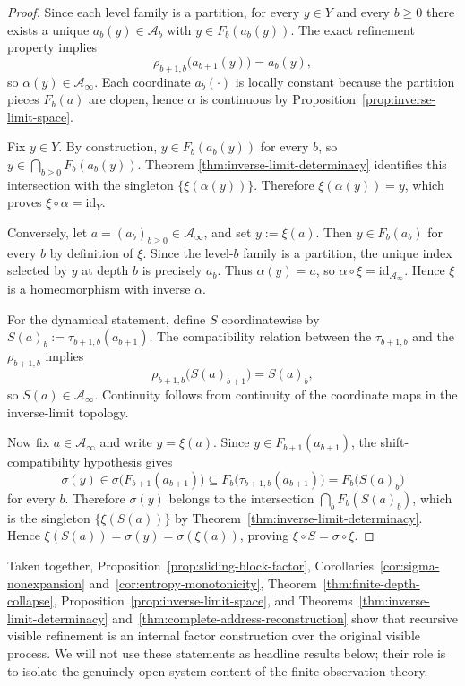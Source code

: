 \begin{proof}
Since each level family is a partition, for every \(y\in Y\) and every
\(b\geq 0\) there exists a unique \(a_b(y)\in\mathcal{A}_b\) with
\(y\in F_b(a_b(y))\).  The exact refinement property implies
\[
  \rho_{b+1,b}\bigl(a_{b+1}(y)\bigr)=a_b(y),
\]
so \(\alpha(y)\in\mathcal{A}_\infty\).  Each coordinate \(a_b(\cdot)\) is
locally constant because the partition pieces \(F_b(a)\) are clopen,
hence \(\alpha\) is continuous by Proposition~\ref{prop:inverse-limit-space}.

Fix \(y\in Y\).  By construction, \(y\in F_b(a_b(y))\) for every \(b\),
so \(y\in \bigcap_{b\geq 0}F_b(a_b(y))\).  Theorem
\ref{thm:inverse-limit-determinacy} identifies this intersection with the
singleton \(\{\xi(\alpha(y))\}\).  Therefore \(\xi(\alpha(y))=y\), which
proves \(\xi\circ\alpha=\mathrm{id}_Y\).

Conversely, let \(a=(a_b)_{b\geq 0}\in\mathcal{A}_\infty\), and set
\(y:=\xi(a)\).  Then \(y\in F_b(a_b)\) for every \(b\) by definition of
\(\xi\).  Since the level-\(b\) family is a partition, the unique index
selected by \(y\) at depth \(b\) is precisely \(a_b\).  Thus
\(\alpha(y)=a\), so \(\alpha\circ\xi=\mathrm{id}_{\mathcal{A}_\infty}\).
Hence \(\xi\) is a homeomorphism with inverse \(\alpha\).

For the dynamical statement, define \(S\) coordinatewise by
\(S(a)_b:=\tau_{b+1,b}(a_{b+1})\).  The compatibility relation between
the \(\tau_{b+1,b}\) and the \(\rho_{b+1,b}\) implies
\[
  \rho_{b+1,b}\bigl(S(a)_{b+1}\bigr)=S(a)_b,
\]
so \(S(a)\in\mathcal{A}_\infty\).  Continuity follows from continuity of
the coordinate maps in the inverse-limit topology.

Now fix \(a\in\mathcal{A}_\infty\) and write \(y=\xi(a)\).  Since
\(y\in F_{b+1}(a_{b+1})\), the shift-compatibility hypothesis gives
\[
  \sigma(y)\in
  \sigma\bigl(F_{b+1}(a_{b+1})\bigr)
  \subseteq F_b\bigl(\tau_{b+1,b}(a_{b+1})\bigr)
  = F_b\bigl(S(a)_b\bigr)
\]
for every \(b\).  Therefore \(\sigma(y)\) belongs to the intersection
\(\bigcap_b F_b(S(a)_b)\), which is the singleton \(\{\xi(S(a))\}\) by
Theorem~\ref{thm:inverse-limit-determinacy}.  Hence
\(\xi(S(a))=\sigma(y)=\sigma(\xi(a))\), proving
\(\xi\circ S=\sigma\circ\xi\).
\end{proof}

\begin{remark}
Taken together, Proposition~\ref{prop:sliding-block-factor},
Corollaries~\ref{cor:sigma-nonexpansion}
and~\ref{cor:entropy-monotonicity},
Theorem~\ref{thm:finite-depth-collapse},
Proposition~\ref{prop:inverse-limit-space}, and
Theorems~\ref{thm:inverse-limit-determinacy}
and~\ref{thm:complete-address-reconstruction} show that recursive
visible refinement is an internal factor construction over the original
visible process.  We will not use these statements as headline results
below; their role is to isolate the genuinely open-system content of the
finite-observation theory.
\end{remark}
